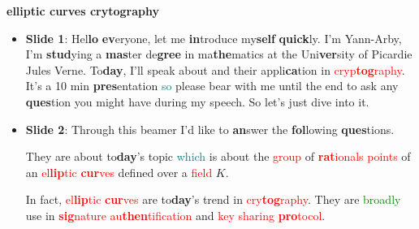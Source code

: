 \begin{center}
    \textbf{el\textbf{lip}tic \textbf{cur}ves cry\textbf{tog}raphy}
\end{center}
\begin{itemize}
    \item \textbf{Slide 1}: Hel\textbf{lo} \textbf{ev}eryone, let me \textbf{in}troduce
        my\textbf{self} \textbf{quick}ly. I'm
        Yann-Arby, I'm \textbf{stud}ying a \textbf{mas}ter de\textbf{gree} in
        ma\textbf{the}matics at the Uni\textbf{ver}sity of Picardie Jules
        Verne. To\textbf{day}, I'll speak about  and their
        appli\textbf{ca}tion in \textcolor{red}{cryp\textbf{tog}raphy}. It's a 10 min \textbf{pres}entation
        \textcolor{teal}{so} please bear with
        me until the end to ask any \textbf{ques}tion you might have during my speech. So let's just
        dive into it.
    \item \textbf{Slide 2}: Through this beamer I'd like to \textbf{an}swer the
        \textbf{fol}lowing \textbf{ques}tions.

        They are about to\textbf{day}'s topic \textcolor{teal}{which} is about the \textcolor{red}{group} of
        \textcolor{red}{\textbf{rat}ionals points} of
            an \textcolor{red}{el\textbf{lip}tic \textbf{cur}ves} defined over a \textcolor{red}{field} $K$. 

            In fact, \textcolor{red}{el\textbf{lip}tic \textbf{cur}ves} are to\textbf{day}'s
            trend in \textcolor{red}{cry\textbf{tog}raphy}. They are \textcolor{green}{broadly} use in
            \textcolor{red}{\textbf{sig}nature au\textbf{then}tification} and \textcolor{red}{key
            sharing \textbf{pro}tocol}. 


\end{itemize}
